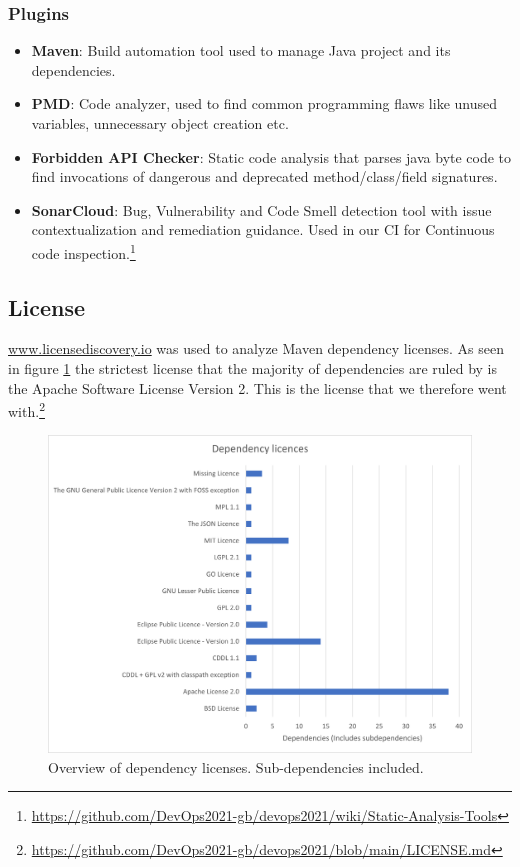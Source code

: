\subsubsection{Plugins}
\begin{itemize}
    \item \textbf{Maven}: Build automation tool used to manage Java project and its dependencies.
    \item \textbf{PMD}: Code analyzer, used to find common programming flaws like unused variables, unnecessary object creation etc. 
    \item \textbf{Forbidden API Checker}: Static code analysis that parses java byte code to find invocations of dangerous and deprecated method/class/field signatures. 
    \item \textbf{SonarCloud}: Bug, Vulnerability and Code Smell detection tool with issue contextualization and remediation guidance. Used in our CI for Continuous code inspection.\footnote{\url{https://github.com/DevOps2021-gb/devops2021/wiki/Static-Analysis-Tools}}
\end{itemize}

\subsection{License}
\url{www.licensediscovery.io} was used to analyze Maven dependency licenses. As seen in figure \ref{fig:licenceDep} the strictest license that the majority of dependencies are ruled by is the Apache Software License Version 2. This is the license that we therefore went with.\footnote{\url{https://github.com/DevOps2021-gb/devops2021/blob/main/LICENSE.md}}
\begin{figure}[H]
    \centering
    \includegraphics[scale=0.65]{report/images/dependency_licences.png}
    \caption{Overview of dependency licenses. Sub-dependencies included.}
    \label{fig:licenceDep}
\end{figure}
